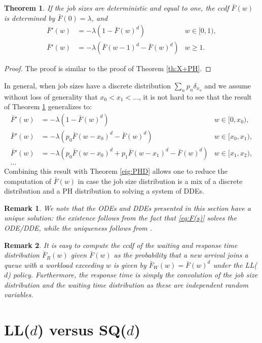\documentclass[12pt]{report}
\newtheorem{theorem}{Theorem}
\newtheorem{remark}{Remark}
\begin{document}
\begin{theorem}\label{thm:det}
If the job sizes are deterministic and equal to one, the ccdf $\bar{F}(w)$ is determined by $\bar{F}(0)=\lambda$, 
and
\begin{align*}
\bar{F}'(w) &= - \lambda (1-\bar{F}(w)^d) & w \in [0,1),\\
\bar{F}'(w) &= - \lambda (\bar{F}(w-1)^d - \bar{F}(w)^d) & w \geq 1.
\end{align*}
\end{theorem}
\begin{proof}
The proof is similar to the proof of Theorem \ref{th:X+PH}.
\end{proof}
In general, when job sizes have a discrete distribution $\sum_n p_n \delta_{x_n}$ and we assume without loss of generality that $x_0 < x_1 < \dots$, it is not hard to see that the result of Theorem \ref{thm:det} generalizes to:
\begin{align*}
\bar F'(w) &= -\lambda (1-\bar F(w)^d) & w \in [0,x_0),\\
\bar F'(w) &= -\lambda (p_0 \bar F(w-x_0)^d - \bar F(w)^d) & w \in [x_0, x_1),\\
\bar F'(w) &= -\lambda ( p_0 \bar F(w-x_0)^d + p_1 \bar F(w-x_1)^d - \bar F(w)^d) & w \in [x_1,x_2),\\
\dots
\end{align*}
Combining this result with Theorem \ref{eig:PHD} allows one to reduce the computation of $\bar F(w)$ in case the job size distribution is a mix of a discrete distribution and a PH distribution to solving a system of DDEs.
\begin{remark}
We note that the ODEs and DDEs presented in this section have a unique solution: the existence follows from the fact that \eqref{eq:F(s)} solves the ODE/DDE, 
while the uniqueness follows from \cite[Section 23, theorem A]{driver1977}.
\end{remark}

\begin{remark}
It is easy to compute the ccdf of the waiting and response time distribution $\bar{F}_R(w)$ given $\bar{F}(w)$ as
the probability that a new arrival joins a queue with a workload exceeding $w$ is given by $\bar F_W(w) = \bar{F}(w)^d$
under the LL($d$) policy. Furthermore, the response time is simply the convolution of the job size distribution and the waiting time distribution as these are independent random variables.
\end{remark}


\section{LL($d$) versus SQ($d$)}\label{sec:versus}
\end{document}
